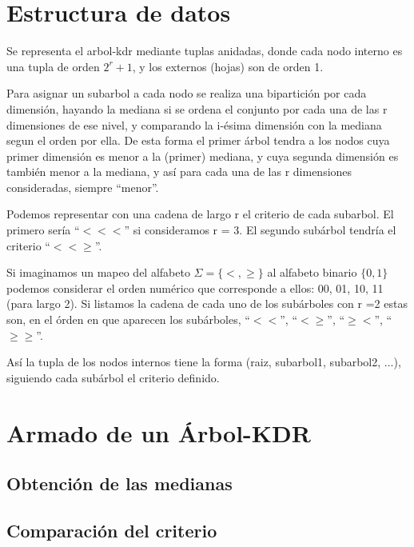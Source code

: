 \section{Estructura de datos}
Se representa el arbol-kdr mediante tuplas anidadas, donde cada
nodo interno es una tupla de orden $2^r + 1$, y los externos (hojas)
son de orden 1.

Para asignar un subarbol a cada nodo se realiza una bipartición por
cada dimensión, hayando la mediana si se ordena el conjunto por cada
una de las r dimensiones de ese nivel, y comparando la i-ésima
dimensión con la mediana segun el orden por ella.
De esta forma el primer árbol tendra a los nodos cuya primer
dimensión es menor a la (primer) mediana, y cuya segunda dimensión
es también menor a la mediana, y así para cada una de las r
dimensiones consideradas, siempre ``menor''.

Podemos representar con una cadena de largo r el
criterio de cada subarbol. El primero sería ``$<<<$'' si consideramos
r = 3. El segundo subárbol tendría el criterio ``$<<\geq$''.

Si imaginamos un mapeo del alfabeto $\Sigma = \{ <, \geq \}$ al
alfabeto binario $\{ 0, 1 \}$ podemos considerar el orden numérico
que corresponde a ellos: 00, 01, 10, 11 (para largo 2).
Si
listamos la cadena de cada uno de los subárboles con r =2 estas son,
en el órden en que aparecen los subárboles, ``$<<$'', ``$<\geq$'',
``$\geq<$'', ``$\geq\geq$''.

Así la tupla de los nodos internos tiene la forma (raiz, subarbol1,
subarbol2, ...), siguiendo cada subárbol el criterio definido.



\section{Armado de un Árbol-KDR}
\subsection{Obtención de las medianas}


\subsection{Comparación del criterio}



